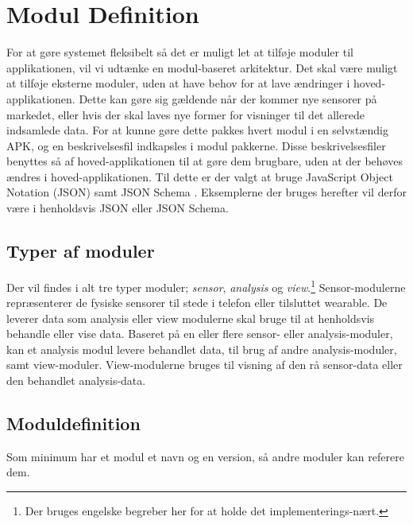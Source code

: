 \section{Modul Definition}\label{modul_definition}


For at gøre systemet fleksibelt så det er muligt let at tilføje moduler til applikationen, vil vi udtænke en modul-baseret arkitektur.
Det skal være muligt at tilføje eksterne moduler, uden at have behov for at lave ændringer i hoved-applikationen.
Dette kan gøre sig gældende når der kommer nye sensorer på markedet, eller hvis der skal laves nye former for visninger til det allerede indsamlede data.
For at kunne gøre dette pakkes hvert modul i en selvstændig APK, og en beskrivelsesfil indkapsles i modul pakkerne. Disse beskrivelsesfiler benyttes så af hoved-applikationen til at gøre dem brugbare, uden at der behøves ændres i hoved-applikationen.
Til dette er der valgt at bruge JavaScript Object Notation (JSON) samt JSON Schema \cite{json_schema}.
Eksemplerne der bruges herefter vil derfor være i henholdsvis JSON eller JSON Schema.

\subsection{Typer af moduler}
Der vil findes i alt tre typer moduler; \textit{sensor}, \textit{analysis} og \textit{view}.\footnote{Der bruges engelske begreber her for at holde det implementerings-nært.}
Sensor-modulerne repræsenterer de fysiske sensorer til stede i telefon eller tilsluttet wearable.
De leverer data som analysis eller view modulerne skal bruge til at henholdsvis behandle eller vise data.
Baseret på en eller flere sensor- eller analysis-moduler, kan et analysis modul levere behandlet data, til brug af andre analysis-moduler, samt view-moduler.
View-modulerne bruges til visning af den rå sensor-data eller den behandlet analysis-data.



\subsection{Moduldefinition}
Som minimum har et modul et navn og en version, så andre moduler kan referere dem.

